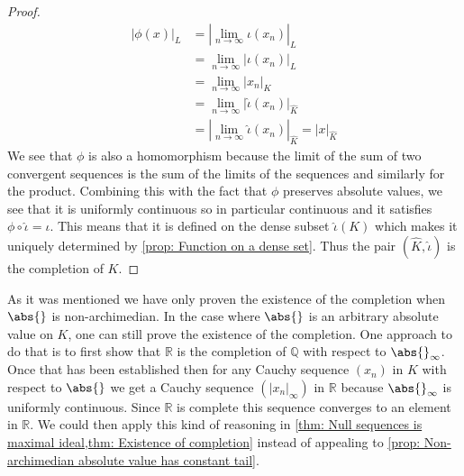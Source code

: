 \documentclass{article}
\newtheorem{remark}{Remark}[section]
\newcommand{\mbb}[1]{\mathbb{#1}}
\numberwithin{equation}{section}
\begin{document}
\begin{proof}
    \begin{align*}
        |\phi(x)|_{L} & = |\lim_{n \to \infty} \iota(x_n)|_{L}                          \\
                      & = \lim_{n \to \infty} |\iota(x_n)|_{L}                          \\
                      & = \lim_{n \to \infty} |x_n|_{K}                                 \\
                      & = \lim_{n \to \infty} |\hat \iota(x_n)|_{\hat K}                \\
                      & = |\lim_{n \to \infty} \hat \iota(x_n)|_{\hat K} = |x|_{\hat K}
    \end{align*}
    We see that $\phi$ is also a homomorphism because the limit of the sum of two convergent sequences is the sum of the limits of the sequences and similarly for the product. Combining this with the fact that $\phi$ preserves absolute values, we see that it is uniformly continuous so in particular continuous and it satisfies $\phi \circ \hat \iota = \iota$. This means that it is defined on the dense subset $\hat \iota(K)$ which makes it uniquely determined by \cref{prop: Function on a dense set}. Thus the pair $(\hat K, \hat \iota)$ is the completion of $K$.
\end{proof}
As it was mentioned we have only proven the existence of the completion when $\abs{}$ is non-archimedian. In the case where $\abs{}$ is an arbitrary absolute value on $K$, one can still prove the existence of the completion. One approach to do that is to first show that $\mbb R$ is the completion of $\mbb Q$ with respect to $\abs{}_\infty$. Once that has been established then for any Cauchy sequence $(x_n)$ in $K$ with respect to $\abs{}$ we get a Cauchy sequence $(|x_n|_\infty)$ in $\mbb R$ because $\abs{}_\infty$ is uniformly continuous. Since $\mbb R$ is complete this sequence converges to an element in $\mbb R$. We could then apply this kind of reasoning in \cref{thm: Null sequences is maximal ideal,thm: Existence of completion} instead of appealing to \cref{prop: Non-archimedian absolute value has constant tail}.
\end{document}
